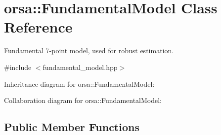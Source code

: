 \hypertarget{classorsa_1_1FundamentalModel}{}\section{orsa\+:\+:Fundamental\+Model Class Reference}
\label{classorsa_1_1FundamentalModel}


Fundamental 7-\/point model, used for robust estimation.  




{\ttfamily \#include $<$fundamental\+\_\+model.\+hpp$>$}



Inheritance diagram for orsa\+:\+:Fundamental\+Model\+:


Collaboration diagram for orsa\+:\+:Fundamental\+Model\+:
\subsection*{Public Member Functions}
